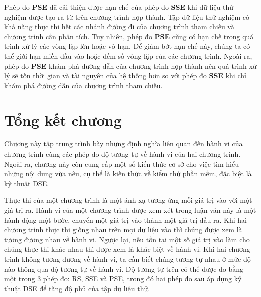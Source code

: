 Phép đo \textbf{PSE} đã cải thiện được hạn chế của phép đo
 \textbf{SSE} khi dữ liệu thử nghiệm được tạo ra từ trên chương trình
 hợp thành. Tập dữ liệu thử nghiệm có khả năng thực thi hết các nhánh
 đường đi của chương trình tham chiếu và chương trình cần phân
 tích. Tuy nhiên, phép đo \textbf{PSE} cũng có hạn chế trong quá trình
 xử lý các vòng lặp lớn hoặc vô hạn. Để giảm bớt hạn chế này, chúng ta
 có thể giới hạn miền đầu vào hoặc đếm số vòng lặp của các chương
 trình. Ngoài ra, phép đo \textbf{PSE} khám phá đường dẫn của chương
 trình hợp thành nên quá trình xử lý sẽ tốn thời gian và tài nguyên
 của hệ thống hơn so với phép đo \textbf{SSE} khi chỉ khám phá đường
 dẫn của chương trình tham chiếu.

 \section*{Tổng kết chương}
 
 Chương này tập trung trình bày những định nghĩa liên quan đến hành vi
 của chương trình cùng các phép đo độ tương tự về hành vi của hai
 chương trình. Ngoài ra, chương này còn cung cấp một số kiến thức cơ
 sở cho việc tìm hiểu những nội dung vừa nêu, cụ thể là kiến thức về
 kiểm thử phần mềm, đặc biệt là kỹ thuật DSE.
 
Thực thi của một chương trình là một ánh xạ tương ứng mỗi giá trị vào
với một giá trị ra. Hành vi của một chương trình được xem xét trong
luận văn này là một hành động một bước, chuyển một giá trị vào thành
một giá trị đầu ra. Khi hai chương trình thực thi giống nhau trên mọi
dữ liệu vào thì chúng được xem là tương đương nhau về hành vi. Ngược
lại, nếu tồn tại một số giá trị vào làm cho chúng thực thi khác nhau
thì được xem là khác biệt về hành vi. Khi hai chương trình không tương
đương về hành vi, ta cần biết chúng tương tự nhau ở mức độ nào thông
qua độ tương tự về hành vi. Độ tương tự trên có thể được đo bằng một
trong $3$ phép đo: RS, SSE và PSE, trong đó hai phép đo sau áp dụng kỹ
thuật DSE để tăng độ phủ của tập dữ liệu thử.

  
